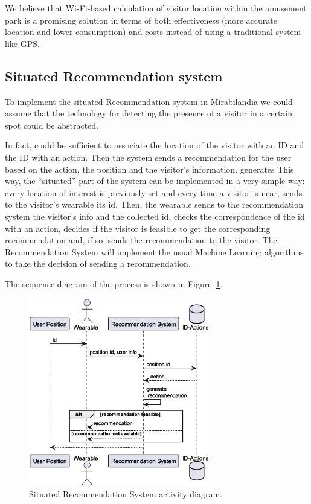 We believe that Wi-Fi-based calculation of visitor location within the amusement park is a promising solution in terms of both effectiveness (more
accurate location and lower consumption) and costs instead of using a traditional system like GPS.


\subsection{Situated Recommendation system}\label{sec:situated-recommendation-sys}
To implement the situated Recommendation system in Mirabilandia we could assume that the technology for detecting the presence of a visitor in a certain spot could be abstracted.

In fact, could be sufficient to associate the location of the visitor with an ID and the ID with an action. Then the system sends a recommendation for the user based on the action, the position and the visitor's information.
generates
This way, the ``situated'' part of the system can be implemented in a very simple way:
every location of interest is previously set and every time a visitor is near, sends to the visitor's wearable its id.
Then, the wearable sends to the recommendation system the visitor's info and the collected id, checks the correspondence of the id with an action, decides if the visitor is feasible to get the corresponding recommendation and, if so, sends the recommendation to the visitor.
The Recommendation System will implement the usual Machine Learning algorithms to take the decision of sending a recommendation.

The sequence diagram of the process is shown in Figure~\ref{fig:situated-recommendation}.

\begin{figure}[H]
	\centering
	\includegraphics[width=0.7\textwidth]{img/seq_diag_situated.eps}
	\caption{Situated Recommendation System activity diagram.}
	\label{fig:situated-recommendation}
\end{figure}

